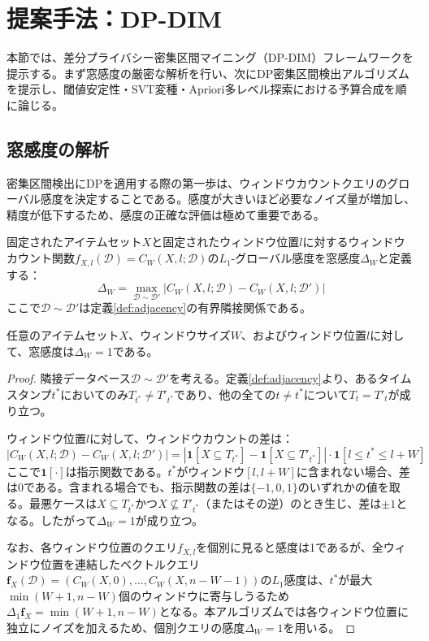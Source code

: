 \section{提案手法：DP-DIM}\label{sec:method}

本節では、差分プライバシー密集区間マイニング（DP-DIM）フレームワークを提示する。まず窓感度の厳密な解析を行い、次にDP密集区間検出アルゴリズムを提示し、閾値安定性・SVT変種・Apriori多レベル探索における予算合成を順に論じる。

\subsection{窓感度の解析}

密集区間検出にDPを適用する際の第一歩は、ウィンドウカウントクエリのグローバル感度を決定することである。感度が大きいほど必要なノイズ量が増加し、精度が低下するため、感度の正確な評価は極めて重要である。

\begin{definition}\label{def:window-sensitivity}
固定されたアイテムセット$X$と固定されたウィンドウ位置$l$に対するウィンドウカウント関数$f_{X,l}(\mathcal{D}) = C_W(X, l; \mathcal{D})$の$L_1$-グローバル感度を窓感度$\Delta_W$と定義する：
\[
\Delta_W = \max_{\mathcal{D} \sim \mathcal{D}'} |C_W(X, l; \mathcal{D}) - C_W(X, l; \mathcal{D}')|
\]
ここで$\mathcal{D} \sim \mathcal{D}'$は定義\ref{def:adjacency}の有界隣接関係である。
\end{definition}

\begin{theorem}[窓感度]\label{thm:window-sensitivity}
任意のアイテムセット$X$、ウィンドウサイズ$W$、およびウィンドウ位置$l$に対して、窓感度は$\Delta_W = 1$である。
\end{theorem}

\begin{proof}
隣接データベース$\mathcal{D} \sim \mathcal{D}'$を考える。定義\ref{def:adjacency}より、あるタイムスタンプ$t^*$においてのみ$T_{t^*} \neq T'_{t^*}$であり、他の全ての$t \neq t^*$について$T_t = T'_t$が成り立つ。

ウィンドウ位置$l$に対して、ウィンドウカウントの差は：
\[
|C_W(X, l; \mathcal{D}) - C_W(X, l; \mathcal{D}')| = |\mathbf{1}[X \subseteq T_{t^*}] - \mathbf{1}[X \subseteq T'_{t^*}]| \cdot \mathbf{1}[l \leq t^* \leq l + W]
\]
ここで$\mathbf{1}[\cdot]$は指示関数である。$t^*$がウィンドウ$[l, l+W]$に含まれない場合、差は0である。含まれる場合でも、指示関数の差は$\{-1, 0, 1\}$のいずれかの値を取る。最悪ケースは$X \subseteq T_{t^*}$かつ$X \not\subseteq T'_{t^*}$（またはその逆）のとき生じ、差は$\pm 1$となる。したがって$\Delta_W = 1$が成り立つ。

なお、各ウィンドウ位置のクエリ$f_{X,l}$を個別に見ると感度は1であるが、全ウィンドウ位置を連結したベクトルクエリ$\mathbf{f}_X(\mathcal{D}) = (C_W(X, 0), \ldots, C_W(X, n-W-1))$の$L_1$感度は、$t^*$が最大$\min(W+1, n-W)$個のウィンドウに寄与しうるため$\Delta_1 \mathbf{f}_X = \min(W+1, n-W)$となる。本アルゴリズムでは各ウィンドウ位置に独立にノイズを加えるため、個別クエリの感度$\Delta_W = 1$を用いる。
\end{proof}

